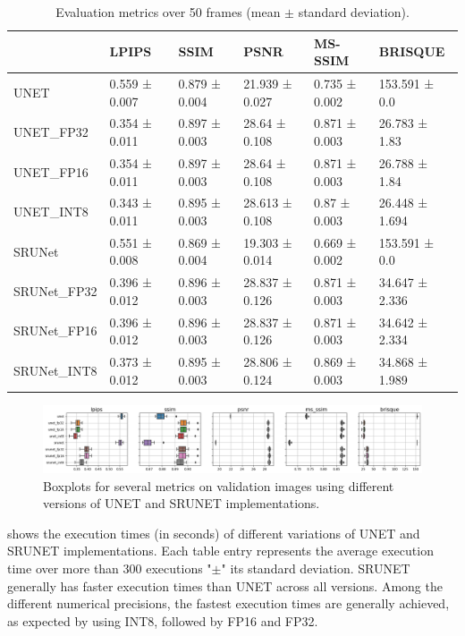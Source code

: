 \begin{table}[t]
\begin{tabular}{llllll}
\toprule
{} &          LPIPS &           SSIM &            PSNR &        MS-SSIM &         BRISQUE \\
\midrule
UNET        &  0.559 ± 0.007 &  0.879 ± 0.004 &  21.939 ± 0.027 &  0.735 ± 0.002 &   153.591 ± 0.0 \\
UNET\_FP32   &  0.354 ± 0.011 &  0.897 ± 0.003 &   28.64 ± 0.108 &  0.871 ± 0.003 &   26.783 ± 1.83 \\
UNET\_FP16   &  0.354 ± 0.011 &  0.897 ± 0.003 &   28.64 ± 0.108 &  0.871 ± 0.003 &   26.788 ± 1.84 \\
UNET\_INT8   &  0.343 ± 0.011 &  0.895 ± 0.003 &  28.613 ± 0.108 &   0.87 ± 0.003 &  26.448 ± 1.694 \\
SRUNet      &  0.551 ± 0.008 &  0.869 ± 0.004 &  19.303 ± 0.014 &  0.669 ± 0.002 &   153.591 ± 0.0 \\
SRUNet\_FP32 &  0.396 ± 0.012 &  0.896 ± 0.003 &  28.837 ± 0.126 &  0.871 ± 0.003 &  34.647 ± 2.336 \\
SRUNet\_FP16 &  0.396 ± 0.012 &  0.896 ± 0.003 &  28.837 ± 0.126 &  0.871 ± 0.003 &  34.642 ± 2.334 \\
SRUNet\_INT8 &  0.373 ± 0.012 &  0.895 ± 0.003 &  28.806 ± 0.124 &  0.869 ± 0.003 &  34.868 ± 1.989 \\
\bottomrule
\end{tabular}
\caption{Evaluation metrics over 50 frames (mean $\pm$ standard deviation).}
\label{tab:metrics}
\end{table}

\begin{figure}[h]
\includegraphics[width=1.0\textwidth]{static/2023_03_02_boxplots_metrics_all.png}
\caption{Boxplots for several metrics on validation images using different versions of UNET and SRUNET implementations.}
\label{fig:metrics}
\end{figure}

 shows the execution times (in seconds) of different variations of UNET and SRUNET implementations. Each table entry represents the average execution time over more than 300 executions "$\pm$" its standard deviation. SRUNET generally has faster execution times than UNET across all versions. Among the different numerical precisions, the fastest execution times are generally achieved, as expected by using INT8, followed by FP16 and FP32.


